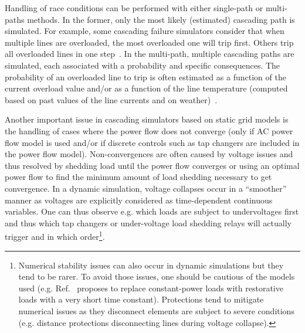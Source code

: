 
Handling of race conditions can be performed with either single-path or multi-paths methods. In the former, only the most likely (estimated) cascading path is simulated. For example, some cascading failure simulators consider that when multiple lines are overloaded, the most overloaded one will trip first. Others trip all overloaded lines in one step~\cite{ManchesterNoebels}. In the multi-path, multiple cascading paths are simulated, each associated with a probability and specific consequences. The probability of an overloaded line to trip is often estimated as a function of the current overload value and/or as a function of the line temperature (computed based on past values of the line currents and on weather)~\cite{Henneaux_level1}.

Another important issue in cascading simulators based on static grid models is the handling of cases where the power flow does not converge (only if AC power flow model is used and/or if discrete controls such as tap changers are included in the power flow model). Non-convergences are often caused by voltage issues and thus resolved by shedding load until the power flow converges or using an optimal power flow to find the minimum amount of load shedding necessary to get convergence. In a dynamic simulation, voltage collapses occur in a ``smoother'' manner as voltages are explicitly considered as time-dependent continuous variables. One can thus observe e.g. which loads are subject to undervoltages first and thus which tap changers or under-voltage load shedding relays will actually trigger and in which order\footnote{Numerical stability issues can also occur in dynamic simulations but they tend to be rarer. To avoid those issues, one should be cautious of the models used (e.g. Ref.~\cite[p93-98]{SongThesis} proposes to replace constant-power loads with restorative loads with a very short time constant). Protections tend to mitigate numerical issues as they disconnect elements are subject to severe conditions (e.g. distance protections disconnecting lines during voltage collapse).}.


